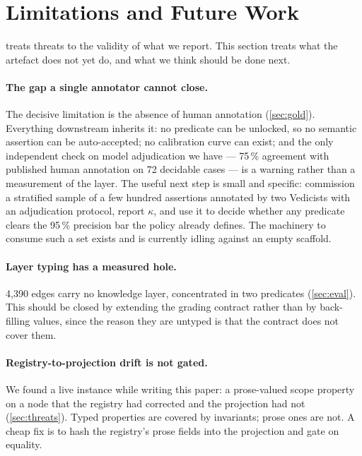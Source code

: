 \section{Limitations and Future Work}
\label{sec:limitations}

 treats threats to the validity of what we report. This section
treats what the artefact does not yet do, and what we think should be done next.

\paragraph{The gap a single annotator cannot close.} The decisive limitation is the
absence of human annotation (\cref{sec:gold}). Everything downstream inherits it: no
predicate can be unlocked, so no semantic assertion can be auto-accepted; no
calibration curve can exist; and the only independent check on model adjudication we
have --- 75\,\% agreement with published human annotation on 72 decidable cases ---
is a warning rather than a measurement of the layer. The useful next step is small
and specific: commission a stratified sample of a few hundred assertions annotated
by two Vedicists with an adjudication protocol, report $\kappa$, and use it to
decide whether any predicate clears the 95\,\% precision bar the policy already
defines. The machinery to consume such a set exists and is currently idling against
an empty scaffold.

\paragraph{Layer typing has a measured hole.} 4{,}390 edges carry no knowledge
layer, concentrated in two predicates (\cref{sec:eval}). This should be closed by
extending the grading contract rather than by back-filling values, since the reason
they are untyped is that the contract does not cover them.

\paragraph{Registry-to-projection drift is not gated.} We found a live instance
while writing this paper: a prose-valued scope property on a  node that
the registry had corrected and the projection had not (\cref{sec:threats}). Typed
properties are covered by invariants; prose ones are not. A cheap fix is to hash the
registry's prose fields into the projection and gate on equality.

